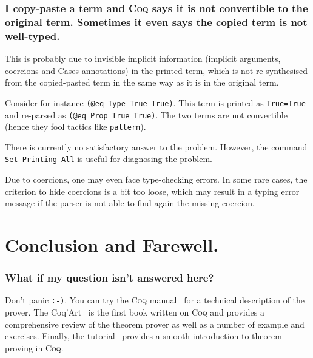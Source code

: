 \documentclass[a4paper,pdftex]{article}
\def\Question#1{\stepcounter{question}\subsubsection{#1}}
\def\Coq{\textsc{Coq}}
\begin{document}
\Question{I copy-paste a term and {\Coq} says it is not convertible
  to the original term. Sometimes it even says the copied term is not
well-typed.}

 This is probably due to invisible implicit information (implicit
arguments, coercions and Cases annotations) in the printed term, which
is not re-synthesised from the copied-pasted term in the same way as
it is in the original term.

  Consider for instance {\tt (@eq Type True True)}. This term is
printed as {\tt True=True} and re-parsed as {\tt (@eq Prop True
True)}. The two terms are not convertible (hence they fool tactics
like {\tt pattern}).

  There is currently no satisfactory answer to the problem. However,
the command {\tt Set Printing All} is useful for diagnosing the
problem.
 
  Due to coercions, one may even face type-checking errors. In some
rare cases, the criterion to hide coercions is a bit too loose, which
may result in a typing error message if the parser is not able to find
again the missing coercion.



\section{Conclusion and Farewell.}
\label{ccl}

\Question{What if my question isn't answered here?} 
\label{lastquestion}

Don't panic \verb+:-)+. You can try the {\Coq} manual~\cite{Coq:manual} for a technical
description of the prover. The Coq'Art~\cite{Coq:coqart} is the first
book written on {\Coq} and provides a comprehensive review of the
theorem prover as well as a number of example and exercises. Finally,
the tutorial~\cite{Coq:Tutorial} provides a smooth introduction to
theorem proving in \Coq.


\newpage
\nocite{LaTeX:intro}
\nocite{LaTeX:symb}


\typeout{*********************************************}
\typeout{*********************************************}
\end{document}
